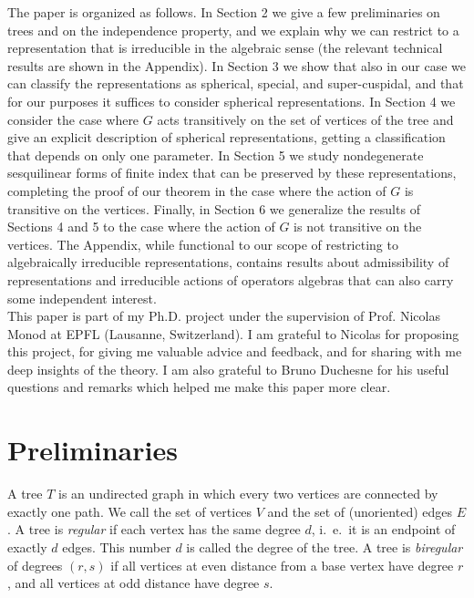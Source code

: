 \documentclass{article}
\theoremstyle{definition}
\theoremstyle{remark}
\theoremstyle{plain}
\begin{document}
The paper is organized as follows. In Section 2 we give a few preliminaries on trees and on the independence property, and we explain why we can restrict to a representation that is irreducible in the algebraic sense (the relevant technical results are shown in the Appendix). In Section 3 we show that also in our case we can classify the representations as spherical, special, and super-cuspidal, and that for our purposes it suffices to consider spherical representations. In Section 4 we consider the case where $G$ acts transitively on the set of vertices of the tree and give an explicit description of spherical representations, getting a classification that depends on only one parameter. In Section 5 we study nondegenerate sesquilinear forms of finite index that can be preserved by these representations, completing the proof of our theorem in the case where the action of $G$ is transitive on the vertices. Finally, in Section 6 we generalize the results of Sections 4 and 5 to the case where the action of $G$ is not transitive on the vertices. The Appendix, while functional to our scope of restricting to algebraically irreducible representations, contains results about admissibility of representations and irreducible actions of operators algebras that can also carry some independent interest. \\

This paper is part of my Ph.D. project under the supervision of Prof. Nicolas Monod at EPFL (Lausanne, Switzerland). I am grateful to Nicolas for proposing this project, for giving me valuable advice and feedback, and for sharing with me deep insights of the theory. I am also grateful to Bruno Duchesne for his useful questions and remarks which helped me make this paper more clear. \\

\section{Preliminaries}

A tree $T$ is an undirected graph in which every two vertices are connected by exactly one path. We call the set of vertices $V$ and the set of (unoriented) edges $E$. A tree is \textit{regular} if each vertex has the same degree $d$, i.~e.~it is an endpoint of exactly $d$ edges. This number $d$ is called the degree of the tree. A tree is \textit{biregular} of degrees $(r,s)$ if all vertices at even distance from a base vertex have degree $r$, and all vertices at odd distance have degree $s$. \\
\end{document}

